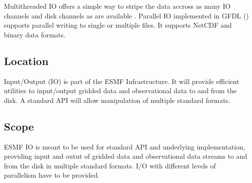 Multithreaded IO offers a simple way to stripe the data accross as many
IO channels and disk channels as are available \cite{MPI-2, 
Balaji_Parallel_IO_1999, Balaji_Parallel_IO_2000}. Parallel IO implemented in 
GFDL (\cite{mpp_io}) supports parallel writing to single or multiple files. 
It supports NetCDF and binary data formats.



\subsection{Location}

Input/Output (IO) is part of the ESMF Infrastructure.  It will provide
efficient utilities to input/output gridded data and observational data
to and from the disk. A standard API will allow manipulation of multiple
standard formats.


\subsection{Scope}

ESMF IO is meant to be used for standard API and underlying implementation, 
providing input and outut of gridded data and observational data streams to 
and from the disk in multiple standard formats. I/O with different levels of 
parallelism have to be provided.  



















